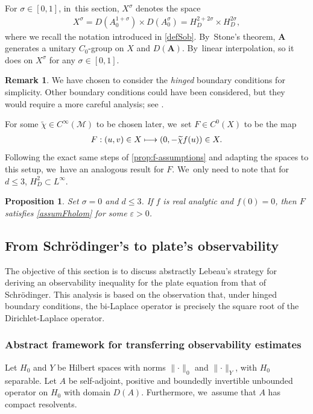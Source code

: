 \documentclass[10pt]{amsart}
\newcommand\mto{\mathchoice{\longmapsto}{\mapsto}{\mapsto}{\mapsto}}
\newtheorem{proposition}[theorem]{Proposition}
\theoremstyle{definition}
\newtheorem{remark}[theorem]{Remark}
\let\mc\mathcal
\let\veps\varepsilon
\newcommand{\M}{\mc{M}}
\newcommand{\bA}{\boldsymbol{A}}
\providecommand{\norm}[1]{\lVert#1\rVert}
\begin{document}
For $\sigma\in [0, 1]$, in~this section, $X^\sigma$ denotes the space
\begin{align*}
X^\sigma=D(A_0^{1+\sigma})\times D(A_0^{\sigma})=H_D^{2+2\sigma}\times H_D^{2\sigma},
\end{align*}
where we recall the notation introduced in \eqref{defSob}. By~Stone's theorem, $\bA$ generates a unitary $C_0$-group on $X$ and $D(\bA)$. By~linear interpolation, so it does on $X^\sigma$ for any $\sigma\in [0, 1]$.

\begin{remark}
We have chosen to consider the \emph{hinged} boundary conditions for simplicity. Other boundary conditions could have been considered, but they would require a more careful analysis; see \cite{ET:15}.
\end{remark}

For some $\widetilde{\chi}\in C^{\infty}(\M)$ to be chosen later, we~set $F\in C^0(X)$ to be the map
\begin{align*}
F: (u, v)\in X\mto (0, -\widetilde{\chi}f(u))\in X.
\end{align*}
Following the exact same steps of \cref{prop:f-assumptions} and adapting the spaces to this setup, we~have an analogous result for $F$. We~only need to note that for $d\leq 3$, $H^{2}_D\subset L^{\infty}$.

\begin{proposition}\label{prop:f-assumptions-pl}
Set $\sigma=0$ and $d\leq 3$. If $f$ is real analytic and $f(0)=0$, then $F$ satisfies \cref{assumFholom} for some $\veps>0$.
\end{proposition}

\subsection{From Schrödinger's to plate's observability}
The objective of this section is to discuss abstractly Lebeau's strategy \cite{Leb92} for deriving an observability inequality for the plate equation from that of Schrödinger. This analysis is based on the observation that, under hinged boundary conditions, the bi-Laplace operator is precisely the square root of the Dirichlet-Laplace operator.

\subsubsection{Abstract framework for transferring observability estimates} Let $H_0$ and $Y$ be Hilbert spaces with norms $\norm{\cdot}_0$ and $\norm{\cdot}_Y$, with $H_0$ separable. Let $A$ be self-adjoint, positive and boundedly invertible unbounded operator on $H_0$ with domain $D(A)$. Furthermore, we~assume that $A$ has compact resolvents.
\end{document}
